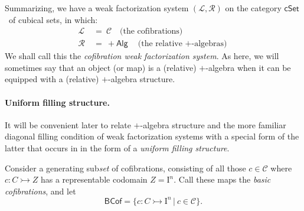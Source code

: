 \documentclass[11pt]{article}
\newcommand{\cSet}{\ensuremath{\mathsf{cSet}}}
\newcommand{\mono}{\ensuremath{\rightarrowtail}}
\newcommand{\I}{\ensuremath{\mathrm{I}}}
\theoremstyle{remark}
\theoremstyle{definition}
\begin{document}
Summarizing, we have a weak factorization system $(\mathcal{L}, \mathcal{R})$ on the category \cSet\ of cubical sets, in which:
\begin{align*}
\mathcal{L}\ &=\ \mathcal{C}\quad \text{(the cofibrations)}\\
\mathcal{R}\ &=\ +\mathsf{Alg}\quad \text{(the relative $+$-algebras)}
\end{align*}
We shall call this the \emph{cofibration weak factorization system}. As here, we will sometimes say that an object (or map) is a (relative) $+$-algebra when it can be equipped with a (relative) $+$-algebra structure.

\paragraph{Uniform filling structure.}

It will be convenient later to relate $+$-algebra structure and the more familiar diagonal filling condition of weak factorization systems with a special form of the latter that occurs in \cite{CCHM} in the form of a \emph{uniform filling structure}. 

Consider a generating sub\emph{set} of cofibrations, consisting of all those $c\in\mathcal{C}$ where $c : C \mono Z$ has a representable codomain $Z=\I^n$.  Call these maps the \emph{basic cofibrations}, and let 
\begin{equation}\label{eq:basiccof}
\mathsf{BCof} = \{c : C\mono \I^n\,|\ c\in \mathcal{C}\}.
\end{equation}
\end{document}
